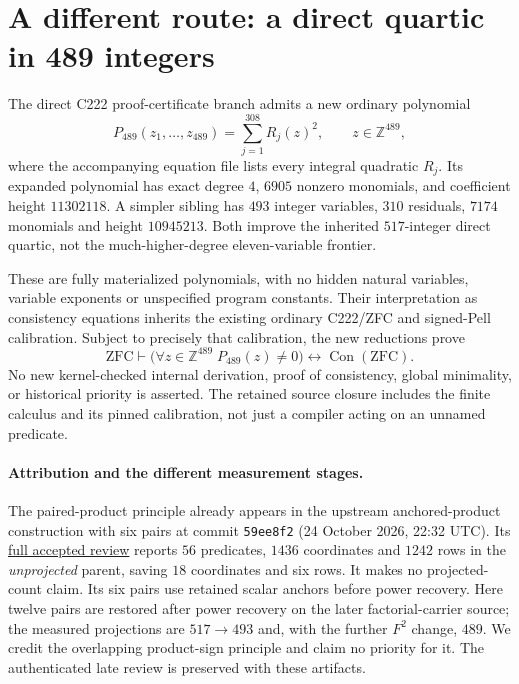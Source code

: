 \section{A different route: a direct quartic in 489 integers}
\label{sec:paired-direct}

The direct C222 proof-certificate branch admits a new ordinary polynomial
\[
 P_{489}(z_1,\ldots,z_{489})=\sum_{j=1}^{308}R_j(z)^2,
 \qquad z\in\mathbb Z^{489},
\]
where the accompanying equation file lists every integral quadratic $R_j$.
Its expanded polynomial has exact degree $4$, $6905$ nonzero monomials,
and coefficient height $11302118$.  A simpler sibling has $493$ integer
variables, $310$ residuals, $7174$ monomials and height $10945213$.
Both improve the inherited $517$-integer direct quartic, not the
much-higher-degree eleven-variable frontier.

These are fully materialized polynomials, with no hidden natural variables,
variable exponents or unspecified program constants. Their interpretation
as consistency equations inherits the existing ordinary C222/ZFC and
signed-Pell calibration. Subject to precisely that calibration, the new
reductions prove
\[
 \mathrm{ZFC}\vdash
 \bigl(\forall z\in\mathbb Z^{489}\;P_{489}(z)\ne0\bigr)
 \longleftrightarrow\operatorname{Con}(\mathrm{ZFC}).
\]
No new kernel-checked internal derivation, proof of consistency, global
minimality, or historical priority is asserted. The retained source closure
includes the finite calculus and its pinned calibration, not just a compiler
acting on an unnamed predicate.


\paragraph{Attribution and the different measurement stages.}
The paired-product principle already appears in the upstream anchored-product construction with six pairs at commit \texttt{59ee8f2} (24 October 2026, 22:32 UTC).
Its \href{https://github.com/VladimirReshetnikov/ProveIt/blob/59ee8f21244635b42f706a74c4e9631226dd1f7c/Computability/DiophantineConsistency/reviews/shared-remainder-product-guards-root-peer.md}{full accepted review}
reports $56$ predicates, $1436$ coordinates and $1242$ rows in the
\emph{unprojected} parent, saving $18$ coordinates and six rows.
It makes no projected-count claim. Its six pairs use retained scalar
anchors before power recovery. Here twelve pairs are restored after
power recovery on the later factorial-carrier source; the measured
projections are $517\to493$ and, with the further $F^2$ change, $489$.
We credit the overlapping product-sign principle and claim no priority
for it. The authenticated late review is preserved with these artifacts.

